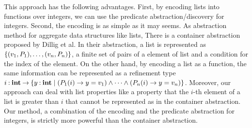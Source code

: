 


This approach has the following advantages.  First, by encoding lists
into functions over integers, we can use the predicate
abstraction/discovery for integers.  Second, the encoding is as simple
as it may seems.  As abstraction method for aggregate data structures
like lists, There is a container abstraction proposed by Dillig et al.
In their abstraction, a list is represented as $\{{(v_1,P_1), \dots,
(v_n,P_n)}\}$, a finite set of pairs of a element of list and a condition
for the index of the element.  On the other hand, by encoding a list as
a function, the same information can be represented as a refinement type
${i\mathbin{:}\mathbf{int}}\mathbin{\rightarrow}{\{{y\mathbin{:}\mathbf{int}\mid (P_1(i) \to y=v_1) \wedge \dots
\wedge (P_n(i) \to y=v_n)}\}}$.  Moreover, our approach can deal with
list properties like a property that the $i$-th element of a list is
greater than $i$ that cannot be represented as in the container
abstraction.  Our method, a combination of the encoding and the
predicate abstraction for integers, is strictly more powerful than the
container abstraction.


